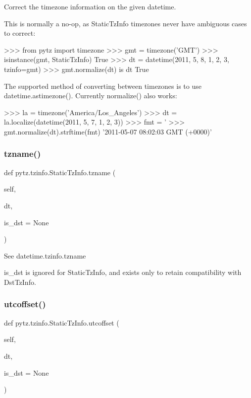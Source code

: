 \begin{DoxyVerb}Correct the timezone information on the given datetime.

This is normally a no-op, as StaticTzInfo timezones never have
ambiguous cases to correct:

>>> from pytz import timezone
>>> gmt = timezone('GMT')
>>> isinstance(gmt, StaticTzInfo)
True
>>> dt = datetime(2011, 5, 8, 1, 2, 3, tzinfo=gmt)
>>> gmt.normalize(dt) is dt
True

The supported method of converting between timezones is to use
datetime.astimezone(). Currently normalize() also works:

>>> la = timezone('America/Los_Angeles')
>>> dt = la.localize(datetime(2011, 5, 7, 1, 2, 3))
>>> fmt = '%
>>> gmt.normalize(dt).strftime(fmt)
'2011-05-07 08:02:03 GMT (+0000)'
\end{DoxyVerb}
 \mbox{\label{classpytz_1_1tzinfo_1_1StaticTzInfo_a721362197fd11f3389792443bffe6ded}} 
\subsubsection{\texorpdfstring{tzname()}{tzname()}}
{\footnotesize\ttfamily def pytz.\+tzinfo.\+Static\+Tz\+Info.\+tzname (\begin{DoxyParamCaption}\item[{}]{self,  }\item[{}]{dt,  }\item[{}]{is\+\_\+dst = {\ttfamily None} }\end{DoxyParamCaption})}

\begin{DoxyVerb}See datetime.tzinfo.tzname

is_dst is ignored for StaticTzInfo, and exists only to
retain compatibility with DstTzInfo.
\end{DoxyVerb}
 \mbox{\label{classpytz_1_1tzinfo_1_1StaticTzInfo_a0020ea03d226193d2de99cfb617596fd}} 
\subsubsection{\texorpdfstring{utcoffset()}{utcoffset()}}
{\footnotesize\ttfamily def pytz.\+tzinfo.\+Static\+Tz\+Info.\+utcoffset (\begin{DoxyParamCaption}\item[{}]{self,  }\item[{}]{dt,  }\item[{}]{is\+\_\+dst = {\ttfamily None} }\end{DoxyParamCaption})}

